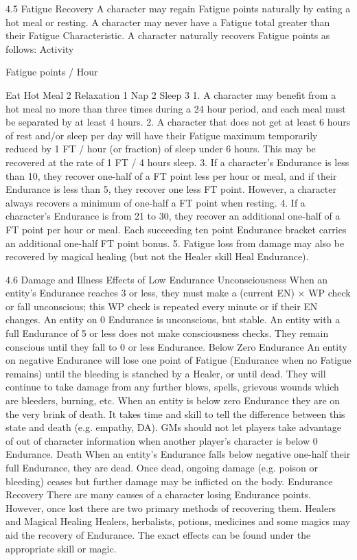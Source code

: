 \documentclass[a4paper]{article}
\begin{document}
\begin{multicols}{3}
4.5 Fatigue Recovery
A character may regain Fatigue points naturally by
eating a hot meal or resting.
A character may never have a Fatigue total greater
than their Fatigue Characteristic.
A character naturally recovers Fatigue points as
follows:
Activity

Fatigue points / Hour

Eat Hot Meal 2
Relaxation
1
Nap
2
Sleep
3
1. A character may benefit from a hot meal no
more than three times during a 24 hour period, and
each meal must be separated by at least 4 hours.
2. A character that does not get at least 6 hours of
rest and/or sleep per day will have their Fatigue
maximum temporarily reduced by 1 FT / hour (or
fraction) of sleep under 6 hours. This may be recovered at the rate of 1 FT / 4 hours sleep.
3. If a character’s Endurance is less than 10, they
recover one-half of a FT point less per hour or
meal, and if their Endurance is less than 5, they
recover one less FT point. However, a character
always recovers a minimum of one-half a FT point
when resting.
4. If a character’s Endurance is from 21 to 30, they
recover an additional one-half of a FT point per
hour or meal. Each succeeding ten point Endurance
bracket carries an additional one-half FT point
bonus.
5. Fatigue loss from damage may also be recovered
by magical healing (but not the Healer skill Heal
Endurance).

4.6 Damage and Illness
Effects of Low Endurance
Unconsciousness When an entity’s Endurance
reaches 3 or less, they must make a (current EN) ×
WP check or fall unconscious; this WP check is
repeated every minute or if their EN changes.
An entity on 0 Endurance is unconscious, but stable. An entity with a full Endurance of 5 or less
does not make consciousness checks. They remain
conscious until they fall to 0 or less Endurance.
Below Zero Endurance An entity on negative
Endurance will lose one point of Fatigue (Endurance when no Fatigue remains) until the bleeding is
stanched by a Healer, or until dead. They will
continue to take damage from any further blows,
spells, grievous wounds which are bleeders, burning, etc.
When an entity is below zero Endurance they are
on the very brink of death. It takes time and skill to
tell the difference between this state and death (e.g.
empathy, DA). GMs should not let players take
advantage of out of character information when
another player’s character is below 0 Endurance.
Death When an entity’s Endurance falls below
negative one-half their full Endurance, they are
dead. Once dead, ongoing damage (e.g. poison or
bleeding) ceases but further damage may be inflicted on the body.
Endurance Recovery
There are many causes of a character losing Endurance points. However, once lost there are two
primary methods of recovering them.
Healers and Magical Healing
Healers, herbalists, potions, medicines and some
magics may aid the recovery of Endurance. The
exact effects can be found under the appropriate
skill or magic.


\end{multicols}
\end{document}
